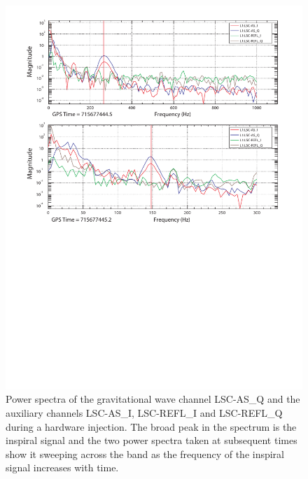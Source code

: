 \begin{figure}[p]
  \vspace{5pt}
  \begin{flushright}
    \includegraphics[width=\textwidth]{figures/hardware/veto_safe}    
  \end{flushright}
  \caption[Study of Veto Safety Using Hardware Injections]{%
  Power spectra of the gravitational wave channel LSC-AS\_Q and the auxiliary
  channels LSC-AS\_I, LSC-REFL\_I and LSC-REFL\_Q during a 
  hardware injection. The broad peak in the spectrum is the inspiral signal
  and the two power spectra taken at subsequent times show it sweeping across
  the band as the frequency of the inspiral signal increases with time.
  }
\label{f:veto_safe}
\end{figure}




